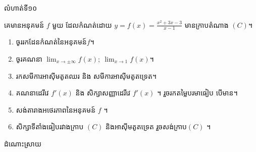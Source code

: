 \documentclass[expologarit]{subfiles}
\begin{document}
\newpage 
\begin{center}
\color{violet} \kml លំហាត់ទី១០
\end{center}
គេមានអនុគមន៍ $f$ មួយ ដែលកំណត់ដោយ $y=f(x)=\frac{x^2+3x-3}{x-1}$ មានក្រាបតំណាង $(C)$។
\begin{enumerate}[k]
\item ចូររកដែនកំណត់នៃអនុគមន៍$f$។
\item ចូរគណនា $\lim_{x\to \pm \infty}f(x);\ \lim_{x\to 1}f(x)$។ 
\item រកសមីការអាស៊ីមតូតឈរ និង សមីការអាស៊ីមតូតទ្រេត។
\item គណនាដេរីវេ $f'(x)$ និង សិក្សាសញ្ញាដេរីវេ $f'(x)$ ។ រួចរកតម្លៃបរមាធៀប បើមាន។ 
\item សង់តារាងអថេរភាពនៃអនុគមន៍ $ f$ ។
\item សិក្សាទីតាំងធៀបរវាងក្រាប $(C)$ និងអាស៊ីមតូតទ្រេត រួចសង់ក្រាប$(C)$ ។ 
\end{enumerate}
\begin{center}
\color{violet} \kml ដំណោះស្រាយ
\end{center}
\end{document}
